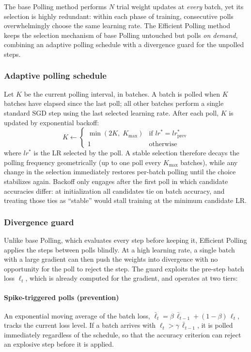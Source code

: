 \documentclass[conference]{IEEEtran}
\begin{document}
The base Polling method performs $N$ trial weight updates at \emph{every} batch, yet its selection is highly redundant: within each phase of training, consecutive polls overwhelmingly choose the same learning rate. The Efficient Polling method keeps the selection mechanism of base Polling untouched but polls \emph{on demand}, combining an adaptive polling schedule with a divergence guard for the unpolled steps.

\subsubsection{Adaptive polling schedule}
Let $K$ be the current polling interval, in batches. A batch is polled when $K$ batches have elapsed since the last poll; all other batches perform a single standard SGD step using the last selected learning rate. After each poll, $K$ is updated by exponential backoff:
\begin{equation}
K \leftarrow
\begin{cases}
\min(2K,\; K_{\max}) & \text{if } lr^{*} = lr^{*}_{\mathrm{prev}} \\
1 & \text{otherwise}
\end{cases}
\label{eq:backoff}
\end{equation}
where $lr^{*}$ is the LR selected by the poll. A stable selection therefore decays the polling frequency geometrically (up to one poll every $K_{\max}$ batches), while any change in the selection immediately restores per-batch polling until the choice stabilizes again. Backoff only engages after the first poll in which candidate accuracies differ: at initialization all candidates tie on batch accuracy, and treating those ties as ``stable'' would stall training at the minimum candidate LR.

\subsubsection{Divergence guard}
Unlike base Polling, which evaluates every step before keeping it, Efficient Polling applies the steps between polls blindly. At a high learning rate, a single batch with a large gradient can then push the weights into divergence with no opportunity for the poll to reject the step. The guard exploits the pre-step batch loss $\ell_t$, which is already computed for the gradient, and operates at two tiers:

\paragraph{Spike-triggered polls (prevention)} An exponential moving average of the batch loss, $\bar{\ell}_t = \beta\,\bar{\ell}_{t-1} + (1-\beta)\,\ell_t$, tracks the current loss level. If a batch arrives with $\ell_t > \gamma\,\bar{\ell}_{t-1}$, it is polled immediately regardless of the schedule, so that the accuracy criterion can reject an explosive step before it is applied.
\end{document}

